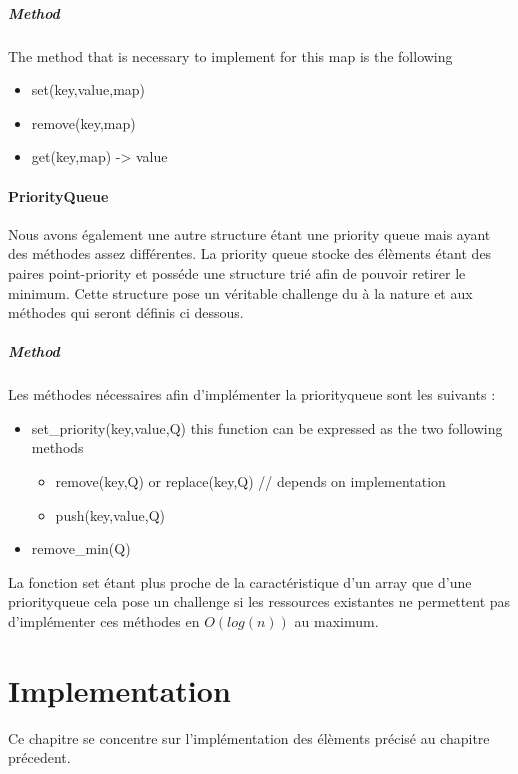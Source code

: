 \documentclass[twoside,12pt, a4paper]{report}
\begin{document}
\paragraph{Method}
The method that is necessary to implement for this map is the following

\begin{itemize}
	\item set(key,value,map)
	\item remove(key,map)
	\item get(key,map) -> value
\end{itemize}

\subsubsection{PriorityQueue}

Nous avons également une autre structure étant une priority queue mais ayant des méthodes assez différentes. La priority queue stocke des élèments étant des paires point-priority et posséde une structure trié afin de pouvoir retirer le minimum. Cette structure pose un véritable challenge du à la nature et aux méthodes qui seront définis ci dessous. 

\paragraph{Method}
Les méthodes nécessaires afin d'implémenter la priorityqueue sont les suivants :

\begin{itemize}
	\item set\_priority(key,value,Q) this function can be expressed as the two following methods
	\begin{itemize}
		\item remove(key,Q) or replace(key,Q) // depends on implementation
		\item push(key,value,Q)
	\end{itemize}
	\item remove\_min(Q)
\end{itemize}

La fonction set étant plus proche de la caractéristique d'un array que d'une priorityqueue cela pose un challenge si les ressources existantes ne permettent pas d'implémenter ces méthodes en $O(log(n))$ au maximum. 



\chapter{Implementation}
Ce chapitre se concentre sur l'implémentation des élèments précisé au chapitre précedent.
\end{document}
